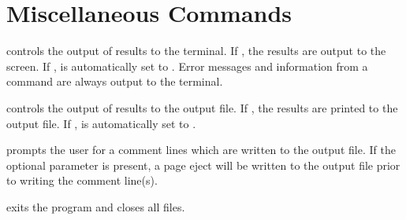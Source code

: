 \section{Miscellaneous Commands}\label{sec:misc}

 {
 controls the output of results to the terminal.  If ,
the results are output to the screen. If ,  is
automatically set to .  Error messages and information from a
 command are always output to the terminal. 
}

 {
 controls the output of results to the output file.  If
, the results are printed to the output file. If ,
 is automatically set to . 
}

 {
 prompts the user for a  comment lines which
are written to the output file.  If the optional parameter  is
present, a page eject will be written to the output file prior to
writing the comment line(s). 
}

 {
 exits the program and closes all files.
}

